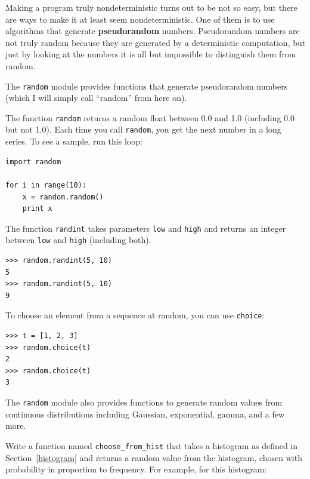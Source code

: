 \documentclass[10pt]{book}
\begin{document}
{Making a program truly nondeterministic turns out to be not so easy,
but there are ways to make it at least seem nondeterministic.  One of
them is to use algorithms that generate {\bf pseudorandom} numbers.
Pseudorandom numbers are not truly random because they are generated
by a deterministic computation, but just by looking at the numbers it
is all but impossible to distinguish them from random.


The {\tt random} module provides functions that generate
pseudorandom numbers (which I will simply call ``random'' from
here on).


The function {\tt random} returns a random float
between 0.0 and 1.0 (including 0.0 but not 1.0).  Each time you
call {\tt random}, you get the next number in a long series.  To see a
sample, run this loop:

\beforeverb
\begin{verbatim}
import random

for i in range(10):
    x = random.random()
    print x
\end{verbatim}
\afterverb
%
The function {\tt randint} takes parameters {\tt low} and
{\tt high} and returns an integer between {\tt low} and
{\tt high} (including both).


\beforeverb
\begin{verbatim}
>>> random.randint(5, 10)
5
>>> random.randint(5, 10)
9
\end{verbatim}
\afterverb
%
To choose an element from a sequence at random, you can use
{\tt choice}:


\beforeverb
\begin{verbatim}
>>> t = [1, 2, 3]
>>> random.choice(t)
2
>>> random.choice(t)
3
\end{verbatim}
\afterverb
%
The {\tt random} module also provides functions to generate
random values from continuous distributions including
Gaussian, exponential, gamma, and a few more.

\begin{ex}


Write a function named \verb"choose_from_hist" that takes
a histogram as defined in Section~\ref{histogram} and returns a 
random value from the histogram, chosen with probability
in proportion to frequency.  For example, for this histogram:


\end{ex}}
\end{document}
